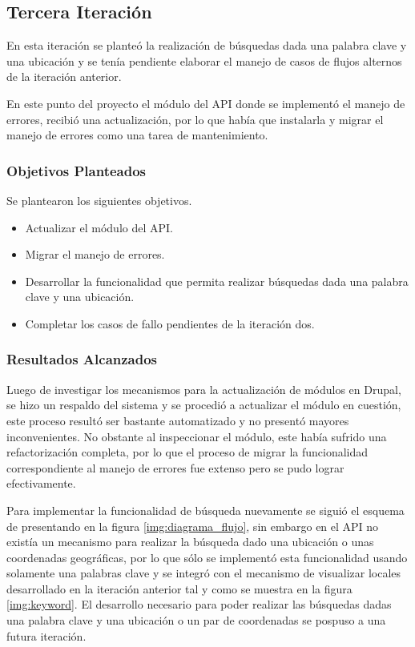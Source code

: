  
\subsection{Tercera Iteración}

En esta iteración se planteó la realización de búsquedas dada una palabra clave y una ubicación y se tenía pendiente elaborar el manejo de casos de flujos alternos de la iteración anterior.

En este punto del proyecto el módulo del API donde se implementó el manejo de errores, recibió una actualización, por lo que había que instalarla y migrar el manejo de errores como una tarea de mantenimiento.

\subsubsection{Objetivos Planteados} 
Se plantearon los siguientes objetivos.
\begin{itemize}
\item Actualizar el módulo del API.
\item Migrar el manejo de errores.
\item Desarrollar la funcionalidad que permita realizar búsquedas dada una palabra clave y una ubicación.
\item Completar los casos de fallo pendientes de la iteración dos.
\end{itemize}

\subsubsection{Resultados Alcanzados}

Luego de investigar los mecanismos para la actualización de módulos en Drupal, se hizo un respaldo del sistema y se procedió a actualizar el módulo en cuestión, este proceso resultó ser bastante automatizado y no presentó mayores inconvenientes. No obstante al inspeccionar el módulo, este había sufrido una refactorización completa, por lo que el proceso de migrar la funcionalidad correspondiente al manejo de errores fue extenso pero se pudo lograr efectivamente.

Para implementar la funcionalidad de búsqueda nuevamente se siguió el esquema de presentando en la figura \ref{img:diagrama_flujo}, sin embargo en el API no existía un mecanismo para realizar la búsqueda dado una ubicación o unas coordenadas geográficas, por lo que sólo se implementó esta funcionalidad usando solamente una palabras clave y se integró con el mecanismo de visualizar locales desarrollado en la iteración anterior tal y como se muestra en la figura \ref{img:keyword}. El desarrollo necesario para poder realizar las búsquedas dadas una palabra clave y una ubicación o un par de coordenadas se pospuso a una futura iteración.

